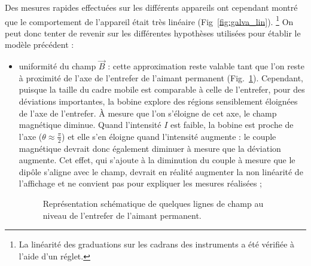 \documentclass[12pt,a4paper,fleqn]{article}
\begin{document}
Des mesures rapides effectuées sur les différents appareils ont cependant montré que le comportement de l'appareil était très linéaire (Fig~\ref{fig:galva_lin}).
\footnote{La linéarité des graduations sur les cadrans des instruments a été vérifiée à l'aide d'un réglet.}
On peut donc tenter de revenir sur les différentes hypothèses utilisées pour établir le modèle précédent :
\begin{itemize}
\item uniformité du champ $\vec{B}$ : cette approximation reste valable tant que l'on reste à proximité de l'axe de l'entrefer de l'aimant permanent (Fig.~\ref{fig:entrefer}).
Cependant, puisque la taille du cadre mobile est comparable à celle de l'entrefer, pour des déviations importantes, la bobine explore des régions sensiblement éloignées de l'axe de l'entrefer.
À mesure que l'on s'éloigne de cet axe, le champ magnétique diminue.
Quand l'intensité $I$ est faible, la bobine est proche de l'axe ($\theta\approx\tfrac{\pi}{2}$) et elle s'en éloigne quand l'intensité augmente : le couple magnétique devrait donc également diminuer à mesure que la déviation augmente.
Cet effet, qui s'ajoute à la diminution du couple à mesure que le dipôle s'aligne avec le champ, devrait en réalité augmenter la non linéarité de l'affichage et ne convient pas pour expliquer les mesures réalisées ;
\begin{figure}[htbp]
    \center
    \caption{Représentation schématique de quelques lignes de champ au niveau de l'entrefer de l'aimant permanent.}
    \label{fig:entrefer}
\end{figure}


\end{itemize}
\end{document}
